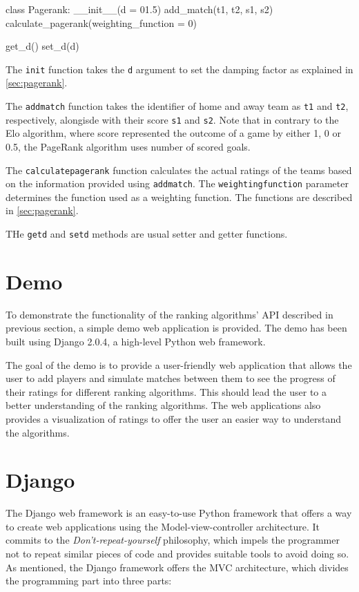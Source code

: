 \begin{python}
class Pagerank:
	__init__(d = 01.5)
	add_match(t1, t2, s1, s2)
	calculate_pagerank(weighting_function = 0)
	
	get_d()
	set_d(d)
\end{python}

\noindent The \texttt{\textunderscore\textunderscore init\textunderscore\textunderscore} function takes the \texttt{d} argument to set the damping factor as explained in \ref{sec:pagerank}.

\noindent The \texttt{add\textunderscore match} function takes the identifier of home and away team as \texttt{t1} and \texttt{t2}, respectively, alongisde with their score \texttt{s1} and \texttt{s2}. Note that in contrary to the Elo algorithm, where score represented the outcome of a game by either 1, 0 or 0.5, the PageRank algorithm uses number of scored goals.

\noindent The \texttt{calculate\textunderscore pagerank} function calculates the actual ratings of the teams based on the information provided using \texttt{add\textunderscore match}. The \texttt{weighting\textunderscore function} parameter determines the function used as a weighting function. The functions are described in \ref{sec:pagerank}.

\noindent THe \texttt{get\textunderscore d} and \texttt{set\textunderscore d} methods are usual setter and getter functions.

\section{Demo}
To demonstrate the functionality of the ranking algorithms' API described in previous section, a simple demo web application is provided. The demo has been built using Django 2.0.4, a high-level Python web framework. 

The goal of the demo is to provide a user-friendly web application that allows the user to add players and simulate matches between them to see the progress of their ratings for different ranking algorithms. This should lead the user to a better understanding of the ranking algorithms. The web applications also provides a visualization of ratings to offer the user an easier way to understand the algorithms.

\section{Django}
The Django web framework is an easy-to-use Python framework that offers a way to create web applications using the Model-view-controller architecture. It commits to the \textit{Don't-repeat-yourself} philosophy, which impels the programmer not to repeat similar pieces of code and provides suitable tools to avoid doing so. As mentioned, the Django framework offers the MVC architecture, which divides the programming part into three parts:


